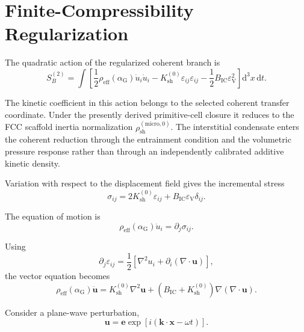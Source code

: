 \section{Finite-Compressibility Regularization}
\label{sec:AP_finite_regularization}

The quadratic action of the regularized coherent branch is
\begin{equation}
    S_{B}^{(2)} = \int \left[ \frac{1}{2}\rho_{\mathrm{eff}}(\alpha_{\mathrm{G}})\dot{u}_{i}\dot{u}_{i} - K_{\mathrm{sh}}^{(0)}\varepsilon_{ij}\varepsilon_{ij} - \frac{1}{2}B_{\mathrm{IC}}\varepsilon_{\mathrm{V}}^2 \right] \mathrm{d}^3x\,\mathrm{d}t.
\end{equation}

The kinetic coefficient in this action belongs to the selected coherent transfer coordinate. Under the presently derived primitive-cell closure it reduces to the FCC scaffold inertia normalization $\rho_{\mathrm{sh}}^{(\mathrm{micro},0)}$. The interstitial condensate enters the coherent reduction through the entrainment condition and the volumetric pressure response rather than through an independently calibrated additive kinetic density.

Variation with respect to the displacement field gives the incremental stress
\begin{equation}
    \sigma_{ij} = 2K_{\mathrm{sh}}^{(0)}\varepsilon_{ij} + B_{\mathrm{IC}}\varepsilon_{\mathrm{V}}\delta_{ij}.
\end{equation}

The equation of motion is
\begin{equation}
    \rho_{\mathrm{eff}}(\alpha_{\mathrm{G}})\ddot{u}_{i} = \partial_{j}\sigma_{ij}.
\end{equation}

Using
\begin{equation}
    \partial_{j}\varepsilon_{ij} = \frac{1}{2}\left[\nabla^2u_{i}+\partial_{i}\left(\nabla\cdot\mathbf{u}\right)\right],
\end{equation}
the vector equation becomes
\begin{equation}
    \rho_{\mathrm{eff}}(\alpha_{\mathrm{G}})\ddot{\mathbf{u}} = K_{\mathrm{sh}}^{(0)}\nabla^2\mathbf{u} + \left(B_{\mathrm{IC}}+K_{\mathrm{sh}}^{(0)}\right)\nabla\left(\nabla\cdot\mathbf{u}\right).
\end{equation}

Consider a plane-wave perturbation,
\begin{equation}
    \mathbf{u} = \mathbf{e}\exp\left[i\left(\mathbf{k}\cdot\mathbf{x}-\omega t\right)\right].
\end{equation}

